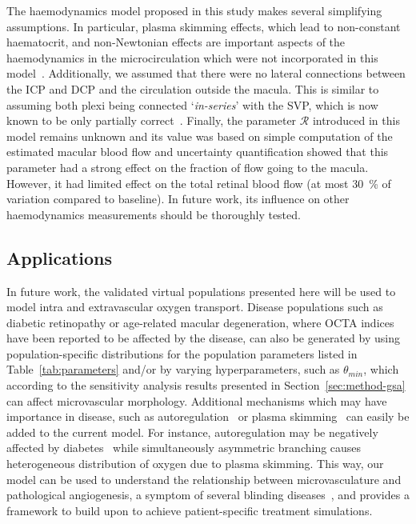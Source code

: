 \documentclass[11pt,]{article}
\begin{document}
The haemodynamics model proposed in this study makes several simplifying assumptions.
In particular, plasma skimming effects, which lead to non-constant haematocrit, and non-Newtonian effects are important aspects of the haemodynamics in the microcirculation which were not incorporated in this model~\cite{Faahraeus1931,Secomb2013}.
Additionally, we assumed that there were no lateral connections between the ICP and DCP and the circulation outside the macula.
This is similar to assuming both plexi being connected `\textit{in-series}' with the SVP, which is now known to be only partially correct~\cite{An2020}.
Finally, the parameter $\mathcal R$ introduced in this model remains unknown and its value was based on simple computation of the estimated macular blood flow and uncertainty quantification showed that this parameter had a strong effect on the fraction of flow going to the macula.
However, it had limited effect on the total retinal blood flow (at most \SI{30}{\percent} of variation compared to baseline).
In future work, its influence on other haemodynamics measurements should be thoroughly tested.

\subsection{Applications}

In future work, the validated virtual populations presented here will be used to model intra and extravascular oxygen transport.
Disease populations such as diabetic retinopathy or age-related macular degeneration, where OCTA indices have been reported to be affected by the disease, can also be generated by using population-specific distributions for the population parameters listed in Table~\ref{tab:parameters} and/or by varying hyperparameters, such as $\theta_{min}$, which according to the sensitivity analysis results presented in Section~\ref{sec:method-gsa} can affect microvascular morphology.
Additional mechanisms which may have importance in disease, such as autoregulation~\cite{Guidoboni2014,Arciero2013} or plasma skimming~\cite{Ganesan_2010} can easily be added to the current model.
For instance, autoregulation may be negatively affected by diabetes~\cite{Stitt_2016} while simultaneously asymmetric branching causes heterogeneous distribution of oxygen due to plasma skimming.
This way, our model can be used to understand the relationship between microvasculature and pathological angiogenesis, a symptom of several blinding diseases~\cite{Medina_2016}, and provides a framework to build upon to achieve patient-specific treatment simulations.
\end{document}
